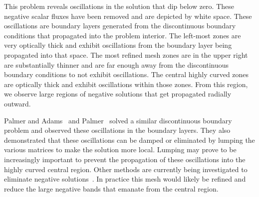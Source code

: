 \documentclass[12pt,letterpaper]{article}
\begin{document}
This problem reveals oscillations in the solution that dip below zero. These negative scalar fluxes have been removed and are depicted by white space. These oscillations are boundary layers generated from the discontinuous boundary conditions that propagated into the problem interior. The left-most zones are very optically thick and exhibit oscillations from the boundary layer being propagated into that space. The most refined mesh zones are in the upper right are substantially thinner and are far enough away from the discontinuous boundary conditions to not exhibit oscillations. The central highly curved zones are optically thick and exhibit oscillations within those zones. From this region, we observe large regions of negative solutions that get propagated radially outward.

Palmer and Adams~\cite{PalmerCurvilinearTransport} and Palmer~\cite{PalmerDissertation} solved a similar discontinuous boundary problem and observed these oscillations in the boundary layers. They also demonstrated that these oscillations can be damped or eliminated by lumping the various matrices to make the solution more local. Lumping may prove to be increasingly important to prevent the propagation of these oscillations into the highly curved central region. Other methods are currently being investigated to eliminate negative solutions~\cite{Maginot2017NonnegativePetrovGalerkin}. In practice this mesh would likely be refined and reduce the large negative bands that emanate from the central region.
\end{document}
